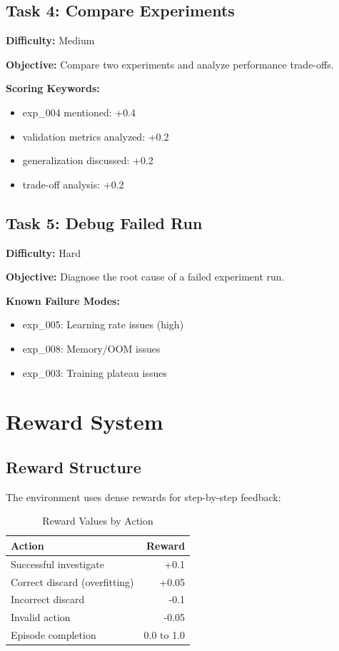 \documentclass[12pt,a4paper]{article}
\begin{document}
\subsection{Task 4: Compare Experiments}

\textbf{Difficulty:} Medium

\textbf{Objective:} Compare two experiments and analyze performance trade-offs.

\textbf{Scoring Keywords:}
\begin{itemize}
	\item exp\_004 mentioned: +0.4
	\item validation metrics analyzed: +0.2
	\item generalization discussed: +0.2
	\item trade-off analysis: +0.2
\end{itemize}

\subsection{Task 5: Debug Failed Run}

\textbf{Difficulty:} Hard

\textbf{Objective:} Diagnose the root cause of a failed experiment run.

\textbf{Known Failure Modes:}
\begin{itemize}
	\item exp\_005: Learning rate issues (high)
	\item exp\_008: Memory/OOM issues
	\item exp\_003: Training plateau issues
\end{itemize}

\section{Reward System}

\subsection{Reward Structure}

The environment uses dense rewards for step-by-step feedback:

\begin{table}[H]
	\centering
	\caption{Reward Values by Action}
	\begin{tabular}{@{}lr@{}}
		\toprule
		\textbf{Action}               & \textbf{Reward} \\
		\midrule
		Successful investigate        & +0.1            \\
		Correct discard (overfitting) & +0.05           \\
		Incorrect discard             & -0.1            \\
		Invalid action                & -0.05           \\
		Episode completion            & 0.0 to 1.0      \\
		\bottomrule
	\end{tabular}
\end{table}
\end{document}
